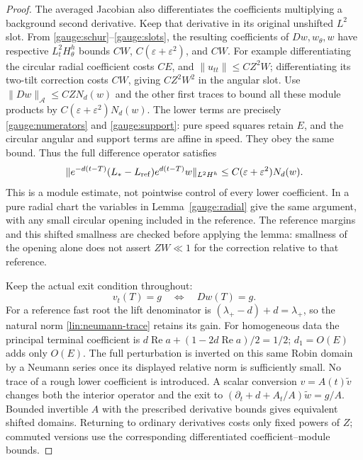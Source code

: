 \begin{proof}
The averaged Jacobian also differentiates the coefficients multiplying
a background second derivative.  Keep that derivative in its original
unshifted $L^2$ slot.  From \eqref{gauge:schur}--\eqref{gauge:slots},
the resulting coefficients of $Dw,w_\theta,w$ have respective
$L^2_tH^h_\theta$ bounds
$CW$, $C(\varepsilon+\varepsilon^2)$, and $CW$.
For example differentiating the circular radial coefficient costs
$CE$, and $\|u_{tt}\|\le CZ^2W$; differentiating its two-tilt
correction costs $CW$, giving $CZ^2W^2$ in the angular slot.
Use $\|Dw\|_{\mathcal A}\le CZN_d(w)$ and the other first traces
to bound all these module products by
$C(\varepsilon+\varepsilon^2)N_d(w)$.
The lower terms are precisely \eqref{gauge:numerators} and
\eqref{gauge:support}: pure speed squares retain $E$, and the
circular angular and support terms are affine in speed.
They obey the same bound.  Thus the full difference operator satisfies
\[
 \|e^{-d(t-T)}(L_*-L_{\rm ref})e^{d(t-T)}w\|_{L^2H^h}
 \le C(\varepsilon+\varepsilon^2)N_d(w).
\]
This is a module estimate, not pointwise control of every lower
coefficient.  In a pure radial chart the variables in
Lemma~\ref{gauge:radial} give the same argument, with any small
circular opening included in the reference.  The reference margins
and this shifted smallness are checked before applying the lemma:
smallness of the opening alone does not assert $ZW\ll1$ for the
correction relative to that reference.

Keep the actual exit condition throughout:
\begin{equation}\label{lin:robin}
 v_t(T)=g\quad\Longleftrightarrow\quad Dw(T)=g.
\end{equation}
For a reference fast root the lift denominator is
$(\lambda_+-d)+d=\lambda_+$, so the natural norm
\eqref{lin:neumann-trace} retains its gain.
For homogeneous data the principal terminal coefficient is
$d\operatorname{Re}a+(1-2d\operatorname{Re}a)/2=1/2$;
$d_1=O(E)$ adds only $O(E)$.
The full perturbation is inverted on this same Robin domain by a
Neumann series once its displayed relative norm is sufficiently small.
No trace of a rough lower coefficient is introduced.
A scalar conversion $v=A(t)\widetilde v$ changes both the interior
operator and the exit to
$(\partial_t+d+A_t/A)\widetilde w=g/A$.
Bounded invertible $A$ with the prescribed derivative bounds gives
equivalent shifted domains.  Returning to ordinary derivatives costs
only fixed powers of $Z$; commuted versions use the corresponding
differentiated coefficient--module bounds.


\end{proof}

